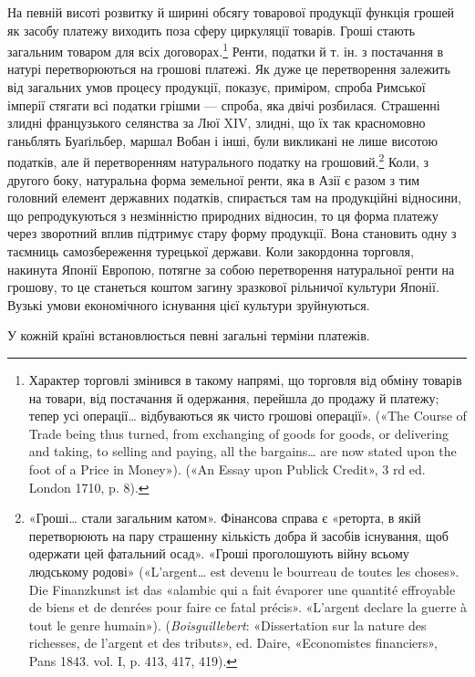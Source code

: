 На певній висоті розвитку й ширині обсягу товарової продукції функція грошей як засобу платежу
виходить поза сферу циркуляції товарів. Гроші стають загальним товаром для всіх
договорах.\footnote{
Характер торговлі змінився в такому напрямі, що торговля від
обміну товарів на товари, від постачання й одержання, перейшла до продажу
й платежу; тепер усі операції\dots{} відбуваються як чисто грошові
операції». («The Course of Trade being thus turned, from exchanging of
goods for goods, or delivering and taking, to selling and paying, all the
bargains\dots{} are now stated upon the foot of a Price in Money»). («An Essay
upon Publick Credit», 3 rd ed. London 1710, p. 8).
} Ренти, податки й т. ін. з постачання в натурі перетворюються
на грошові платежі. Як дуже це перетворення
залежить від загальних умов процесу продукції, показує, приміром,
спроба Римської імперії стягати всі податки грішми —
спроба, яка двічі розбилася. Страшенні злидні французького
селянства за Люї XIV, злидні, що їх так красномовно ганьблять
Буаґільбер, маршал Вобан і інші, були викликані не лише висотою
податків, але й перетворенням натурального податку на
грошовий.\footnote{
«Гроші\dots{} стали загальним катом». Фінансова справа є «реторта, в
якій перетворюють на пару страшенну кількість добра й засобів існування,
щоб одержати цей фатальний осад». «Гроші проголошують війну всьому
людському родові» («L’argent\dots{} est devenu le bourreau de toutes les choses».
Die Finanzkunst ist das «alambic qui a fait évaporer une quantité
effroyable de biens et de denrées pour faire ce fatal précis». «L’argent declare
la guerre à tout le genre humain»). (\emph{Boisguillebert}: «Dissertation sur la
nature des richesses, de l’argent et des tributs», ed. Daire, «Economistes
financiers», Pans 1843. vol. I, p. 413, 417, 419).
} Коли, з другого боку, натуральна форма земельної
ренти, яка в Азії є разом з тим головний елемент державних
податків, спирається там на продукційні відносини, що репродукуються
з незмінністю природних відносин, то ця форма платежу
через зворотний вплив підтримує стару форму продукції. Вона
становить одну з таємниць самозбереження турецької держави.
Коли закордонна торговля, накинута Японії Европою, потягне
за собою перетворення натуральної ренти на грошову, то це
станеться коштом загину зразкової рільничої культури Японії.
Вузькі умови економічного існування цієї культури зруйнуються.

У кожній країні встановлюється певні загальні терміни платежів.

